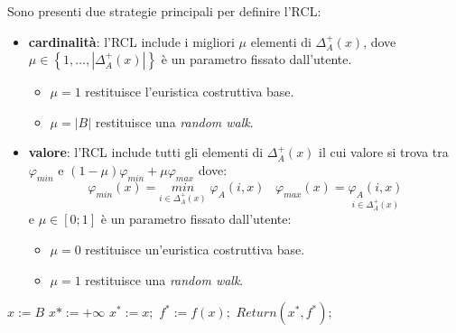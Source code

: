 \documentclass{article}
\begin{document}
Sono presenti due strategie principali per definire l'RCL:
\begin{itemize}
    \item \textbf{cardinalità}: l'RCL include i migliori $\mu$ elementi di $\Delta_A^+(x)$, dove
          $\mu\in\left\{1,\dots,|\Delta_A^+(x)|\right\}$ è un parametro fissato dall'utente.
          \begin{itemize}
              \item $\mu=1$ restituisce l'euristica costruttiva base.
              \item $\mu=|B|$ restituisce una \textit{random walk}.
          \end{itemize}
    \item \textbf{valore}: l'RCL include tutti gli elementi di $\Delta_A^+(x)$ il cui valore
          si trova tra $\varphi_{min}$ e $(1-\mu)\varphi_{min}+\mu\varphi_{max}$ dove:
          $$\varphi_{min}(x)=\underset{i\in\Delta_A^+(x)}{min}\;\varphi_A(i,x)\;\;\;\varphi_{max}(x)=\underset{i\in\Delta_A^+(x)}{\varphi_A(i,x)}$$
          e $\mu\in[0;1]$ è un parametro fissato dall'utente:
          \begin{itemize}
              \item $\mu=0$ restituisce un'euristica costruttiva base.
              \item $\mu=1$ restituisce una \textit{random walk}.
          \end{itemize}

\end{itemize}

\begin{algorithm}[H]
    \caption{$GRASP(I)$}
    \begin{algorithmic}
        \State $x:=B$
        \State $x*:=+\infty$
        \EndWhile
        \State $x^*:=x;$
        \State $f^*:=f(x);$
        \EndIf
        \EndFor
        \State $Return(x^*,f^*);$
    \end{algorithmic}
\end{algorithm}
\end{document}
